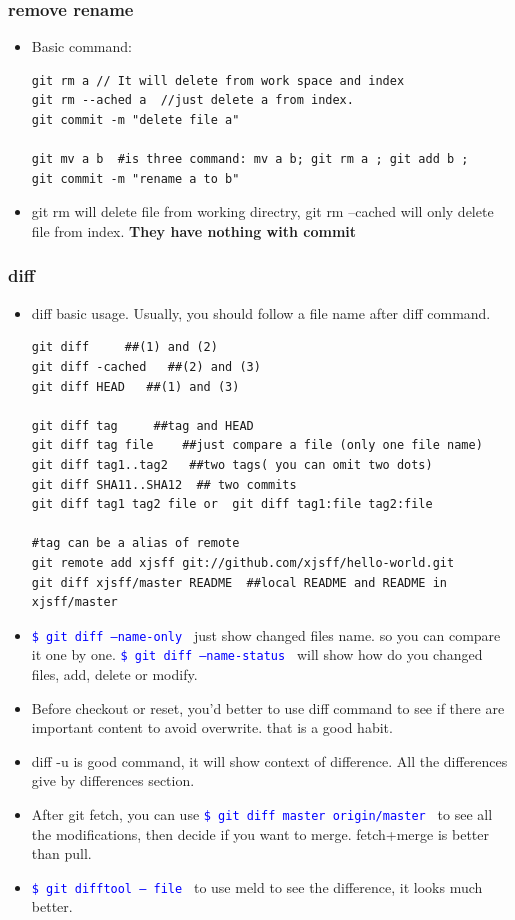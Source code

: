 \documentclass[a4paper,12pt,twoside]{book}
\newcommand{\linuxcommand}[1]{\texttt{\textcolor{blue}{\$ #1 \Pisymbol{psy}{191}}}}
\begin{document}
\subsubsection{remove rename}
\begin{itemize}
		\item Basic command:
\begin{verbatim}
git rm a // It will delete from work space and index
git rm --ached a  //just delete a from index.
git commit -m "delete file a"

git mv a b  #is three command: mv a b; git rm a ; git add b ;
git commit -m "rename a to b"
\end{verbatim}
		\item git rm will delete file from working directry, git rm --cached will only delete file from index. \textbf{They have nothing with commit}
		\end{itemize}

\subsubsection{diff}
\begin{itemize}
\item diff basic usage. Usually, you should follow a file name after diff command. 

\begin{verbatim}
git diff     ##(1) and (2)
git diff -cached   ##(2) and (3)
git diff HEAD   ##(1) and (3)

git diff tag     ##tag and HEAD
git diff tag file    ##just compare a file (only one file name)
git diff tag1..tag2   ##two tags( you can omit two dots)
git diff SHA11..SHA12  ## two commits
git diff tag1 tag2 file or  git diff tag1:file tag2:file

#tag can be a alias of remote
git remote add xjsff git://github.com/xjsff/hello-world.git
git diff xjsff/master README  ##local README and README in xjsff/master
\end{verbatim}
		\item \linuxcommand{git diff --name-only} just show changed files name. so you can compare it one by one.  \linuxcommand{git diff --name-status} will show how do you changed files, add, delete or modify. 

		\item Before checkout or reset, you'd better to use diff command to see if there are important content to avoid overwrite. that is a good habit. 

		\item diff -u is good command, it will show context of difference.  All the differences give by differences section.
   
\item  After git fetch, you can use \linuxcommand{git diff master origin/master} to see all the modifications, then decide if you want to merge. fetch+merge is better than pull.
   
\item \linuxcommand{git difftool -- file} to use meld to see the difference, it looks much better.
\end{itemize}
\end{document}
